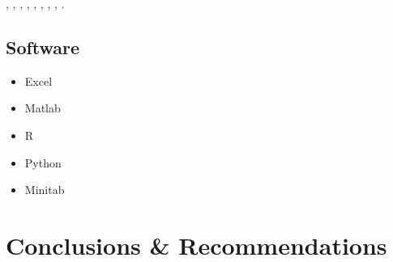 \documentclass[11pt,a4paper,article]{memoir} %
\begin{document}
\cite{hastie2013elements}, \cite{gelman2013bayesian}, \cite{faraway2004linear}, \cite{blitzstein2014linear}, \cite{jaynes2003probability}, \cite{wickham2009ggplot2}, \cite{montgomery2000design}, \cite{kruschke2015doing}, \cite{iso2014statistical}.


\section{Software}
\begin{itemize}
\item Excel
\item Matlab
\item R
\item Python
\item Minitab
\end{itemize}

\newpage


\chapter{Conclusions \& Recommendations}


\newpage



\newpage
\appendix
\chapter{}
\end{document}
